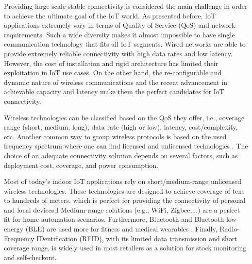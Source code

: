 \documentclass[]{IEEEtran}
\begin{document}


Providing large-scale stable connectivity is considered the main challenge in order to achieve the ultimate goal of the IoT world. As presented before, IoT applications extremely vary in terms of Quality of Service (QoS) and network requirements. Such a wide diversity makes it almost impossible to have single communication technology that fits all IoT segments\cite{vaezi_cellular_2022_2}. 
Wired networks are able to provide extremely reliable connectivity with high data rates and low latency. However, the cost of installation and rigid architecture has limited their exploitation in IoT use cases. On the other hand, the re-configurable and dynamic nature of wireless communications and the recent advancement in achievable capacity and latency make them the perfect candidates for IoT connectivity.

Wireless technologies can be classified based on the QoS they offer, i.e., coverage range (short, medium, long), data rate (high or low), latency, cost/complexity, etc. Another common way to group wireless protocols is based on the used frequency spectrum where one can find licensed and unlicensed technologies \cite{xu_narrowband_2018_3}. The choice of an adequate connectivity solution depends on several factors, such as deployment cost, coverage, and power consumption.

Most of today's indoor IoT applications rely on short/medium-range unlicensed wireless technologies. These technologies are designed to achieve coverage of tens to hundreds of meters, which is perfect for providing the connectivity of personal and local devices.I Medium-range solutions (e.g., WiFi, Zigbee,...) are a perfect fit for home automation scenarios. Furthermore, Bluetooth and Bluetooth low-energy (BLE) are used more for fitness and medical wearables \cite{vaezi_cellular_2022_2}. Finally, Radio-Frequency IDentification (RFID), with its limited data transmission and short coverage range, is widely used in most retailers as a solution for stock monitoring and self-checkout\cite{beyene_nb-iot_2017}.
\end{document}

